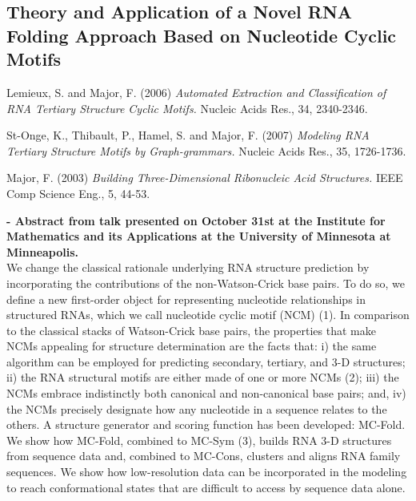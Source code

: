 \subsection*{Theory and Application of a Novel RNA Folding Approach Based on
Nucleotide Cyclic Motifs}

\begin{thebibliography}{1}
 Lemieux, S.  and Major, F.  (2006) {\em Automated Extraction and
Classification of RNA Tertiary  Structure Cyclic Motifs.} Nucleic Acids
Res., 34, 2340-2346.

 St-Onge,  K., Thibault, P., Hamel,  S. and Major,
  F. (2007) {\em Modeling
RNA Tertiary  Structure Motifs  by Graph-grammars.} Nucleic  Acids Res.,
35, 1726-1736.

 Major, F.  (2003) {\em Building Three-Dimensional Ribonucleic Acid
Structures.} IEEE Comp Science Eng., 5, 44-53.
\end{thebibliography}

\noindent
\textbf{ - Abstract from talk presented on October 31st at the Institute
  for Mathematics and its  Applications at the University of Minnesota
  at Minneapolis.}
\\

\noindent
We change the classical  rationale underlying RNA structure prediction
by  incorporating  the  contributions  of  the  non-Watson-Crick  base
pairs. To do  so, we define a new  first-order object for representing
nucleotide relationships in structured  RNAs, which we call nucleotide
cyclic  motif (NCM)  (1). In  comparison  to the  classical stacks  of
Watson-Crick base pairs, the properties that make NCMs
appealing for structure determination are  the facts that: i) the same
algorithm can be employed  for predicting secondary, tertiary, and 3-D
structures; ii)  the RNA structural motifs  are either made  of one or
more NCMs (2);  iii) the NCMs embrace indistinctly  both canonical and
non-canonical base pairs;  and, iv) the NCMs precisely
designate how  any nucleotide in a  sequence relates to  the others. A
structure   generator  and  scoring   function  has   been  developed:
MC-Fold. We show  how MC-Fold, combined to MC-Sym  (3), builds RNA 3-D
structures from  sequence data and, combined to  MC-Cons, clusters and
aligns RNA  family sequences. We  show how low-resolution data  can be
incorporated in  the modeling to reach conformational  states that are
difficult to access by sequence data alone.





